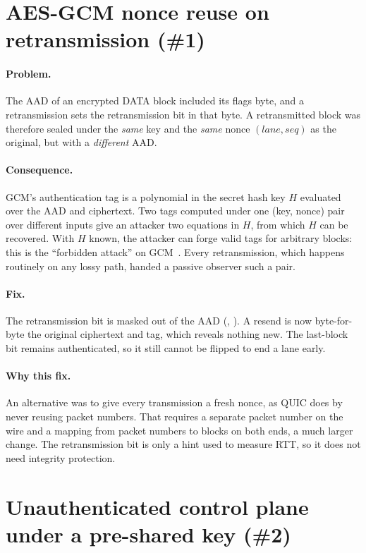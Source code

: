 \section{AES-GCM nonce reuse on retransmission (\#1)}\label{sec:nonce}

\paragraph{Problem.} The AAD of an encrypted DATA block included its flags byte, and a retransmission sets the
retransmission bit in that byte. A retransmitted block was therefore sealed under the \emph{same} key and the
\emph{same} nonce $(\mathit{lane},\mathit{seq})$ as the original, but with a \emph{different} AAD.

\paragraph{Consequence.} GCM's authentication tag is a polynomial in the secret hash key $H$ evaluated over the
AAD and ciphertext. Two tags computed under one (key, nonce) pair over different inputs give an attacker two
equations in $H$, from which $H$ can be recovered. With $H$ known, the attacker can forge valid tags for
arbitrary blocks: this is the ``forbidden attack'' on GCM~\cite{joux,nist-gcm}. Every retransmission, which
happens routinely on any lossy path, handed a passive observer such a pair.

\paragraph{Fix.} The retransmission bit is masked out of the AAD (, ). A
resend is now byte-for-byte the original ciphertext and tag, which reveals nothing new. The last-block bit
remains authenticated, so it still cannot be flipped to end a lane early.

\paragraph{Why this fix.} An alternative was to give every transmission a fresh nonce, as QUIC does by never
reusing packet numbers. That requires a separate packet number on the wire and a mapping from packet numbers to
blocks on both ends, a much larger change. The retransmission bit is only a hint used to measure RTT, so it does
not need integrity protection.

\section{Unauthenticated control plane under a pre-shared key (\#2)}

